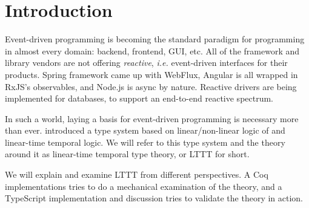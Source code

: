\chapter{Introduction}\label{chap:introduction}

Event-driven programming is becoming the standard paradigm for programming in almost every domain: backend, frontend, GUI, etc. All of the framework and library vendors are not offering \textit{reactive}, \textit{i.e.} event-driven interfaces for their products. Spring framework came up with WebFlux, Angular is all wrapped in RxJS's observables, and Node.js is async by nature. Reactive drivers are being implemented for databases, to support an end-to-end reactive spectrum.

In such a world, laying a basis for event-driven programming is necessary more than ever. \cite{Paykin2016TheEO} introduced a type system based on linear/non-linear logic of \cite{DBLP:conf/csl/Benton94} and linear-time temporal logic. We will refer to this type system and the theory around it as linear-time temporal type theory, or LTTT for short.

We will explain and examine LTTT from different perspectives. A Coq implementations tries to do a mechanical examination of the theory, and a TypeScript implementation and discussion tries to validate the theory in action.


